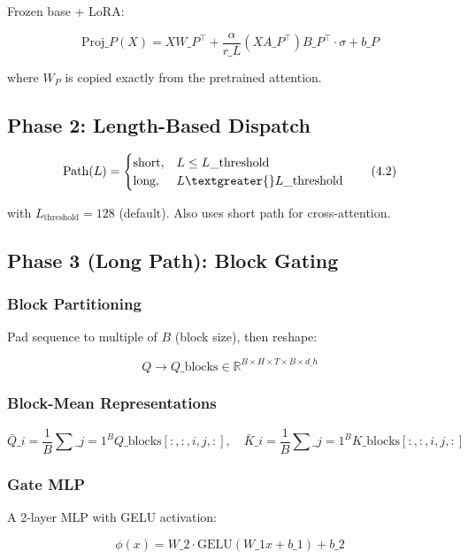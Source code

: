 Frozen base + LoRA:

\[
\text{Proj}\_P(X) = X W\_P^\top + \frac{\alpha}{r\_L} (X A\_P^\top) B\_P^\top \cdot \sigma + b\_P
\tag{4.1}
\]

where $W_P$ is copied exactly from the pretrained attention.

\subsection{Phase 2: Length-Based Dispatch}

\[
\text{Path}(L) = \begin{cases}
\text{short}, & L \leq L\_\text{threshold} \\
\text{long}, & L \textgreater{} L\_\text{threshold}
\end{cases}
\tag{4.2}
\]

with $L_\text{threshold} = 128$ (default). Also uses short path for 
cross-attention.

\subsection{Phase 3 (Long Path): Block Gating}

\subsubsection{Block Partitioning}

Pad sequence to multiple of $B$ (block size), then reshape:

\[
Q \to Q\_\text{blocks} \in \mathbb{R}^{B \times H \times T \times B \times d\_h}
\tag{4.3}
\]

\subsubsection{Block-Mean Representations}

\[
\bar{Q}\_i = \frac{1}{B} \sum\_{j=1}^{B} Q\_\text{blocks}[:, :, i, j, :], \quad
\bar{K}\_i = \frac{1}{B} \sum\_{j=1}^{B} K\_\text{blocks}[:, :, i, j, :]
\tag{4.4}
\]

\subsubsection{Gate MLP}

A 2-layer MLP with GELU activation:

\[
\phi(x) = W\_2 \cdot \text{GELU}(W\_1 x + b\_1) + b\_2
\tag{4.5}
\]

